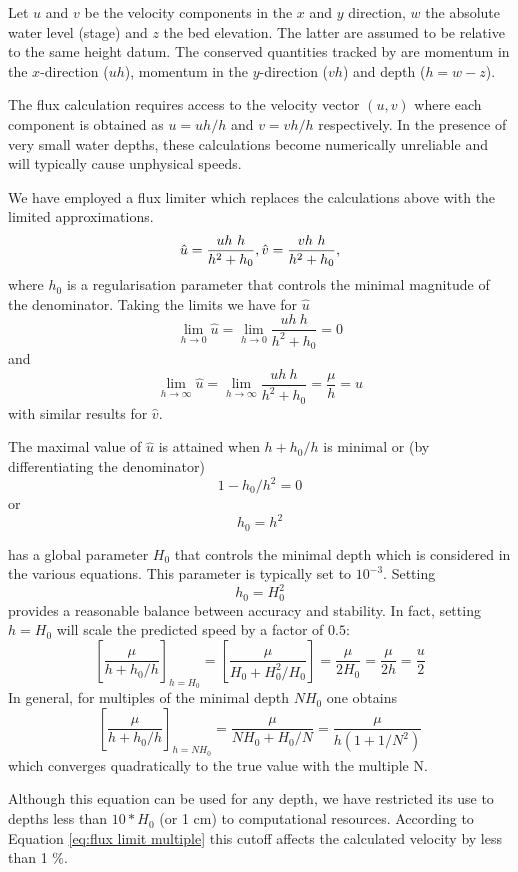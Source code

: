 \documentclass{manual}
\begin{document}
Let $u$ and $v$ be the velocity components in the $x$ and $y$ direction,
$w$ the absolute water level (stage) and
$z$ the bed elevation. The latter are assumed to be relative to the
same height datum.
The conserved quantities tracked by \anuga are momentum in the
$x$-direction ($uh$), momentum in the $y$-direction ($vh$)
and depth ($h = w-z$).

The flux calculation requires access to the velocity vector $(u, v)$
where each component is obtained as $u = uh/h$ and $v = vh/h$ respectively.
In the presence of very small water depths, these calculations become
numerically unreliable and will typically cause unphysical speeds.

We have employed a flux limiter which replaces the calculations above with
the limited approximations.
\begin{equation}
  \hat{u} = \frac{uh\ h}{h^2 + h_0}, \bigskip \hat{v} = \frac{vh\ h}{h^2 + h_0},
\end{equation}
where $h_0$ is a regularisation parameter that controls the minimal
magnitude of the denominator. Taking the limits we have for $\hat{u}$
\[
  \lim_{h \rightarrow 0} \hat{u} =
  \lim_{h \rightarrow 0} \frac{uh\ h}{h^2 + h_0} = 0
\]
and
\[
  \lim_{h \rightarrow \infty} \hat{u} =
  \lim_{h \rightarrow \infty} \frac{uh\ h}{h^2 + h_0} = \frac{\mu}{h} = u
\]
with similar results for $\hat{v}$.

The maximal value of $\hat{u}$ is attained when $h+h_0/h$ is minimal or (by differentiating the denominator)
\[
  1 - h_0/h^2 = 0
\]
or
\[
  h_0 = h^2
\]

\anuga has a global parameter $H_0$ that controls the minimal depth which
is considered in the various equations. This parameter is typically set to
$10^{-3}$. Setting
\[
  h_0 = H_0^2
\]
provides a reasonable balance between accuracy and stability. In fact,
setting $h=H_0$ will scale the predicted speed by a factor of $0.5$:
\[
  \left[ \frac{\mu}{h + h_0/h} \right]_{h = H_0} = 
  \left[ \frac{\mu}{H_0 + H_0^2/H_0} \right] = 
  \frac{\mu}{2 H_0} = \frac{\mu}{2 h} = \frac{u}{2} 
\]
In general, for multiples of the minimal depth $N H_0$ one obtains
\begin{equation}
  \left[ \frac{\mu}{h + h_0/h} \right]_{h = N H_0} =
  \frac{\mu}{N H_0 + H_0/N} =   
  \frac{\mu}{h (1 + 1/N^2)} 
  \label{eq:flux limit multiple} 
\end{equation} 
which converges quadratically to the true value with the multiple N.

Although this equation can be used for any depth, we have restricted its use to depths less than $10 * H_0$ (or 1 cm) to computational resources.  
According to Equation \ref{eq:flux limit multiple} this cutoff    
affects the calculated velocity by less than 1 \%. 
\end{document}
